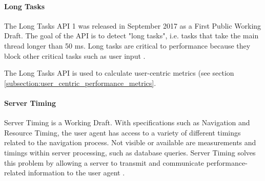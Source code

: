 





\paragraph{Long Tasks} %

The Long Tasks API 1 was released in September 2017 as a First Public Working Draft.
The goal of the API is to detect "long tasks", i.e. tasks that take the main thread longer than 50 ms.
Long tasks are critical to performance because they block other critical tasks such as user input \cite{2017W3CLongTasks}.

The Long Tasks API is used to calculate user-centric metrics (see section \ref{subsection:user_centric_performance_metrics}.






\paragraph{Server Timing} %

Server Timing is a Working Draft.
With specifications such as Navigation and Resource Timing, the user agent has access to a variety of different timings related to the navigation process.
Not visible or available are measurements and timings within server processing, such as database queries.
Server Timing solves this problem by allowing a server to transmit and communicate performance-related information to the user agent \cite{2021W3CServerTiming}.

